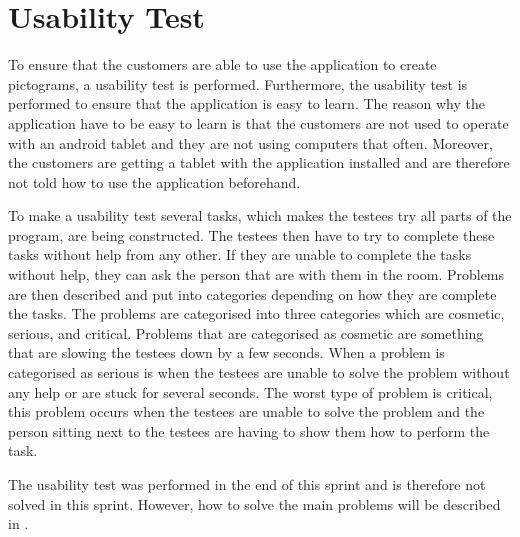 \section{Usability Test}\label{sec:usability-test}
To ensure that the customers are able to use the application to create pictograms, a usability test is performed.
Furthermore, the usability test is performed to ensure that the application is easy to learn.
The reason why the application have to be easy to learn is that the customers are not used to operate with an android tablet and they are not using computers that often.
Moreover, the customers are getting a tablet with the application installed and are therefore not told how to use the application beforehand.

To make a usability test several tasks, which makes the testees try all parts of the program, are being constructed. 
The testees then have to try to complete these tasks without help from any other.
If they are unable to complete the tasks without help, they can ask the person that are with them in the room.
Problems are then described and put into categories depending on how they are complete the tasks.
The problems are categorised into three categories which are cosmetic, serious, and critical.
Problems that are categorised as cosmetic are something that are slowing the testees down by a few seconds.
When a problem is categorised as serious is when the testees are unable to solve the problem without any help or are stuck for several seconds.
The worst type of problem is critical, this problem occurs when the testees are unable to solve the problem and the person sitting next to the testees are having to show them how to perform the task.

The usability test was performed in the end of this sprint and is therefore not solved in this sprint.
However, how to solve the main problems will be described in .

